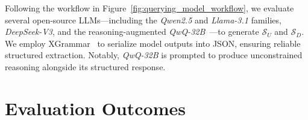 \documentclass[11pt,a4paper]{article}
\begin{document}
Following the workflow in Figure~\ref{fig:querying_model_workflow}, we evaluate several open-source LLMs—including the \textit{Qwen2.5} and \textit{Llama-3.1} families, \textit{DeepSeek-V3}, and the reasoning-augmented \textit{QwQ-32B}~\cite{qwen2025qwen25technicalreport, dubey2024llama3herdmodels, deepseekai2025deepseekv3technicalreport}—to generate $\mathcal{S}_U$ and $\mathcal{S}_D$. We employ XGrammar~\cite{dong2025xgrammar} to serialize model outputs into JSON, ensuring reliable structured extraction. Notably, \textit{QwQ-32B} is prompted to produce unconstrained reasoning alongside its structured response.


\section{Evaluation Outcomes}
\label{sec:individual_preservation_analysis}
\end{document}

